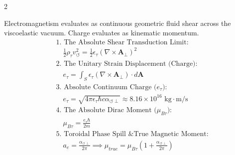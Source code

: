 \documentclass[11pt, a4paper]{article}
\newcounter{cheatnum}
\begin{document}
\begin{multicols}{2}
\begin{tcolorbox}[cheatbox, title={\refstepcounter{cheatnum}\label{box:kinematic_charge}\thecheatnum. The Kinematic Origin of Charge \& $g-2$ \scriptsize\hfill\hyperref[sec:deriv_kinematic_charge]{[Proof $\downarrow$]}}]
Electromagnetism evaluates as continuous geometric fluid shear across the viscoelastic vacuum. Charge evaluates as kinematic momentum.
\begin{align}
    &\text{1. The Absolute Shear Transduction Limit:} \nonumber \\
    &\quad \frac{1}{2}\rho_{\tau} v_{\circlearrowleft}^2 = \frac{1}{2}\epsilon_{\tau} (\nabla \times \mathbf{A}_{\perp})^2 \label{eq:shear_transduction_limit} \\
    &\text{2. The Unitary Strain Displacement (Charge):} \nonumber \\
    &\quad e_{\tau} = \int_S \epsilon_{\tau} (\nabla \times \mathbf{A}_{\perp}) \cdot d\mathbf{A} \label{eq:charge_displacement} \\
    &\text{3. Absolute Continuum Charge ($e_{\tau}$):} \nonumber \\
    &\quad e_{\tau} = \sqrt{4\pi \epsilon_{\tau} \hbar c \alpha_{\circlearrowleft \perp}} \approx 8.16 \times 10^{16} \text{ kg}\cdot\text{m/s} \label{eq:absolute_charge_derived} \\
    &\text{4. The Absolute Dirac Moment ($\mu_{B\tau}$):} \nonumber \\
    &\quad \mu_{B\tau} = \frac{e_{\tau} \hbar}{2m} \label{eq:bohr_magneton} \\
    &\text{5. Toroidal Phase Spill \& True Magnetic Moment:} \nonumber \\
    &\quad a_e = \frac{\alpha_{\circlearrowleft \perp}}{2\pi} \implies \mu_{true} = \mu_{B\tau} \left( 1 + \frac{\alpha_{\circlearrowleft \perp}}{2\pi} \right) \label{eq:true_magnetic_moment}
\end{align}
\end{tcolorbox}


\end{multicols}
\end{document}
